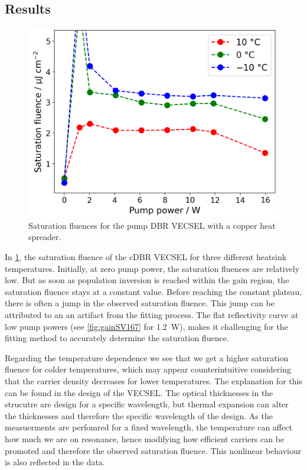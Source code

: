 \subsection*{Results}

\begin{figure}
    \vspace{-\baselineskip}
    \centering
    \includegraphics[width=.98\textwidth]{images/param0.png}
    \caption{Saturation fluences for the pump DBR VECSEL with a copper heat spreader.}
    \label{fig:fsat}
\end{figure}
In \cref{fig:fsat}, the saturation fluence of the cDBR VECSEL for three different heatsink temperatures.
Initially, at zero pump power, the saturation fluences are relatively low. But as soon as population inversion is reached within the gain region, the saturation fluence stays at a constant value. Before reaching the constant plateau, there is often a jump in the observed saturation fluence. This jump can be attributed to an an artifact from the fitting process. The flat reflectivity curve at low pump powers (see \cref{fig:gainSV167} for \qty{1.2}{\W}), makes it challenging for the fitting method to accurately determine the saturation fluence.

Regarding the temperature dependence we see that we get a higher saturation fluence for colder temperatures, which may appear counterintuitive considering that the carrier density decreases for lower temperatures. The explanation for this can be found in the design of the VECSEL. The optical thicknesses in the strucutre are design for a specific wavelength, but thermal expansion can alter the thicknesses and therefore the specific wavelength of the design. %
As the measuerments are perfomred for a fixed wavelength, the temperature can affect how much we are on resonance, hence modifying how efficient carriers can be promoted and therefore the observed saturation fluence. This nonlinear behaviour is also reflected in the data.


